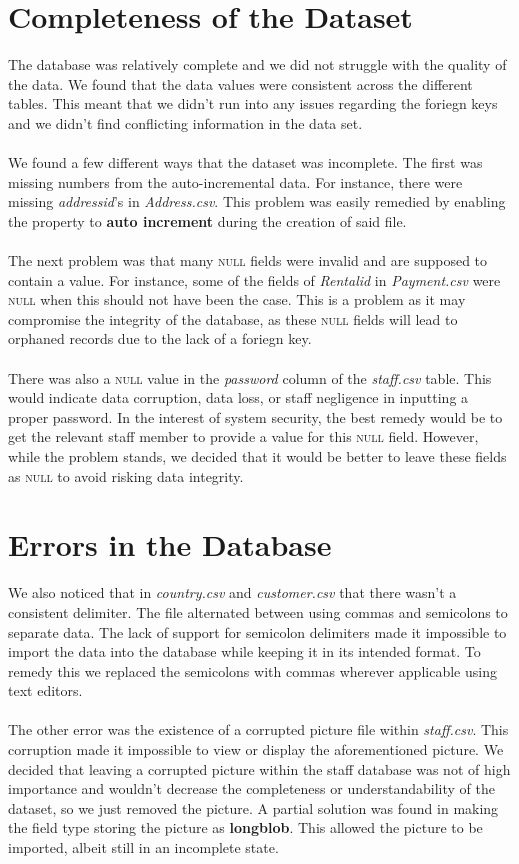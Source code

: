 \documentclass{article}
\begin{document}
\section{Completeness of the Dataset}
	The database was relatively complete and we did not struggle with the quality of the data. We found that the data values were consistent across the different tables. This meant
	 that we didn’t run into any issues regarding the foriegn keys and we didn’t find conflicting information in the data set.
	\\\\
	We found a few different ways that the dataset was incomplete. The first was missing numbers from the auto-incremental data. For instance,
	 there were missing \emph{address\textunderscore id}’s in \emph{Address.csv}. This problem was easily remedied by enabling the property to \textbf{auto increment} during the creation of said file. 
	\\\\
	The next problem was
	 that many \textsc{null} fields were invalid and are supposed to contain a value. 
	For instance, some of the fields of \emph{Rental\textunderscore id} in \emph{Payment.csv} were \textsc{null} when this should not have been the case. This is a problem as it 
	may compromise the integrity
	 of the database, as these \textsc{null} fields will lead to orphaned records due to the lack of a foriegn key.
	\\\\
	There was also a \textsc{null} value in the \emph{password} column of the \emph{staff.csv} table. This would indicate data corruption, data loss, or staff negligence in inputting a proper password. In the interest of system security, the best remedy would be to get the relevant staff member to provide a value for this \textsc{null} field. However, while the problem stands, we decided that it would be better to leave these fields as \textsc{null} to avoid risking data integrity.

\section{Errors in the Database}
	We also noticed that in \emph{country.csv} and \emph{customer.csv} that there wasn’t a consistent delimiter. The file alternated between using commas 
	and semicolons to separate data. The lack of support for semicolon delimiters made it impossible to import the data into the database while keeping it in its intended format. 
	To remedy this we replaced the semicolons with commas wherever applicable using text editors.
	\\\\
	The other error was the existence of a corrupted picture file within \emph{staff.csv}. This corruption made it impossible to view or display the aforementioned picture. 
	We decided that leaving a corrupted picture within the staff database was not of high importance and wouldn’t decrease the completeness or understandability of the dataset,
	so we just removed the picture. A partial solution was found in making the field type storing the picture as \textbf{longblob}. 
	This allowed the picture to be imported, albeit still in an incomplete state. 
\end{document}
